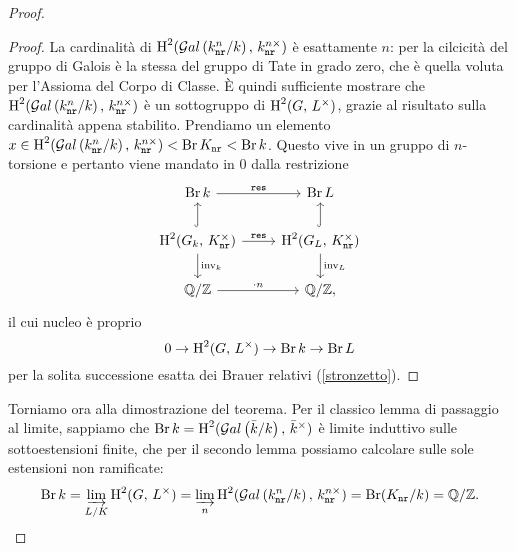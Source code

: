 \begin{proof}
\begin{proof}
	La cardinalità di $ \operatorname{H}^2(\mathcal{G}al\left( k_\mathtt{nr}^n/k \right),\, k_\mathtt{nr}^{n\times}) $ è esattamente $ n $: per la cilcicità del gruppo di Galois è la stessa del gruppo di Tate in grado zero, che è quella voluta per l'Assioma del Corpo di Classe. È quindi sufficiente mostrare che $ \operatorname{H}^2(\mathcal{G}al\left( k_\mathtt{nr}^n/k \right),\, k_\mathtt{nr}^{n\times}) $ è un sottogruppo di $ \operatorname{H}^2(G,\, L^\times ) $, grazie al risultato sulla cardinalità appena stabilito.
	Prendiamo un elemento $ x \in \operatorname{H}^2(\mathcal{G}al\left( k_\mathtt{nr}^n/k \right),\, k_\mathtt{nr}^{n\times}) < \operatorname{Br} K_\mathtt{nr} < \operatorname{Br} k $. Questo vive in un gruppo di $ n $-torsione e pertanto viene mandato in $ 0 $ dalla restrizione
	\[ \begin{tikzcd}
	\Br \K \rar["\Res"]
	& \Br L \\
	\HH^2(G_\K, \, \knr^\times) \rar["\Res"] \dar["\inv_\K"] \arrow[hook]{u}
	& \HH^2(G_L, \, \knr^\times) \dar["\inv_L"] \arrow[hook]{u} \\
	\Q/\Z \rar["\cdot n"]
	& \Q/\Z,
	\end{tikzcd} \]
	il cui nucleo è proprio
	\[ 0 \to \operatorname{H}^2(G, \, L^\times) \to \operatorname{Br} k \to \operatorname{Br} L \]
	per la solita successione esatta dei Brauer relativi (\ref{stronzetto}).
\end{proof}

Torniamo ora alla dimostrazione del teorema. Per il classico lemma di passaggio al limite, sappiamo che $ \operatorname{Br} k = \operatorname{H}^2(\mathcal{G}al\left( \bar{k}/k \right), \, \bar{k}^\times) $ è limite induttivo sulle sottoestensioni finite, che per il secondo lemma possiamo calcolare sulle sole estensioni non ramificate:
\[ \operatorname{Br} k = \varinjlim_{L/K} \operatorname{H}^2(G, \, L^\times) = \varinjlim_{n} \operatorname{H}^2(\mathcal{G}al\left( k_\mathtt{nr}^n/k \right),\, k_\mathtt{nr}^{n\times}) = \operatorname{Br} (K_\mathtt{nr} /k) = \mathbb{Q}/\mathbb{Z}. \]

\end{proof}